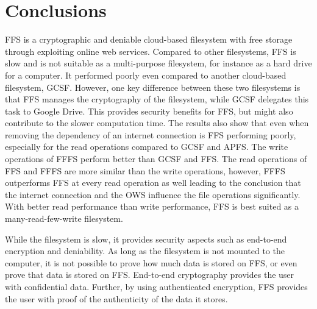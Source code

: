 
\section{Conclusions}
\label{sec:conclusions}
  


FFS is a cryptographic and deniable cloud-based filesystem with free storage through exploiting online web services. Compared to other filesystems, FFS is slow and is not suitable as a multi-purpose filesystem, for instance as a hard drive for a computer. It performed poorly even compared to another cloud-based filesystem, GCSF. However, one key difference between these two filesystems is that FFS manages the cryptography of the filesystem, while GCSF delegates this task to Google Drive. This provides security benefits for FFS, but might also contribute to the slower computation time. The results also show that even when removing the dependency of an internet connection is FFS performing poorly, especially for the read operations compared to GCSF and APFS. The write operations of FFFS perform better than GCSF and FFS. The read operations of FFS and FFFS are more similar than the write operations, however, FFFS outperforms FFS at every read operation as well leading to the conclusion that the internet connection and the OWS influence the file operations significantly. With better read performance than write performance, FFS is best suited as a many-read-few-write filesystem.

While the filesystem is slow, it provides security aspects such as end-to-end encryption and deniability. As long as the filesystem is not mounted to the computer, it is not possible to prove how much data is stored on FFS, or even prove that data is stored on FFS. End-to-end cryptography provides the user with confidential data. Further, by using authenticated encryption, FFS provides the user with proof of the authenticity of the data it stores. 